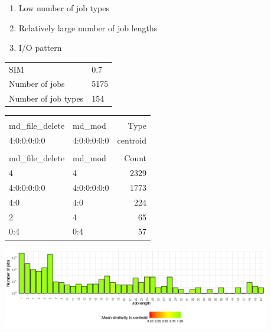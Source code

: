 \documentclass[]{llncs}
\begin{document}
\begin{enumerate}
 \item Low number of job types
 \item Relatively large number of job lengths
 \item I/O pattern 
\end{enumerate}
\begingroup
  \centering
  \begin{tabular}{ll}
    SIM & 0.7 \\
    Number of jobs & 5175 \\
    Number of job types & 154 \\
  \end{tabular}
  \label{fig:pm_quant:stats}
\endgroup
\begingroup
  \centering
  \begin{tiny}
    \begin{tabular}{@{ }l@{ }@{ }l@{ }|@{ }r@{ }}
      \rowcolor{tabhcolor}
      \multicolumn{2}{@{ }l|@{ }}{Hexadecimal coding} &              \\ 
      \rowcolor{tabhcolor}
      md\_file\_delete     &  md\_mod     & Type     \\ 
      \hline
      4:0:0:0:0:0          &  4:0:0:0:0:0 & centroid \\ 
      \multicolumn{3}{l}{} \\ 
			\rowcolor{tabhcolor}
      md\_file\_delete     &  md\_mod     & Count    \\ 
      \hline
      4                    &  4           & 2329     \\ 
      4:0:0:0:0:0          &  4:0:0:0:0:0 & 1773     \\ 
      4:0                  &  4:0         & 224      \\ 
      2                    &  4           & 65       \\ 
      0:4                  &  0:4         & 57       \\ 
    \end{tabular}
  \end{tiny}
  \label{fig:pm_quant:top_jobs}
\endgroup
\begingroup
  \centering
  \includegraphics[width=4.61in,height=1.39in]{./media/image21.png}
  \label{fig:pm_quant:length}
\endgroup
\end{document}
